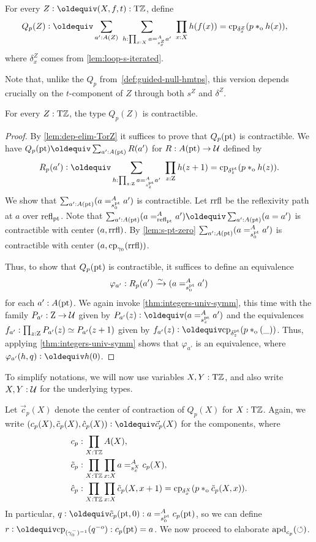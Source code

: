 \documentclass[a4paper,12pt]{amsart}
\begin{document}
\begin{definition}\label{def:guided-null-hmtps-dep}
For every $Z\defeq(X,f,t):\TorZ$, define
\begin{align*}\label{eq:TBD}
Q_p(Z)&\defeq \sum_{a' : A(Z)}~\sum_{h : \prod_{x:X} a =^A_{s^Z_x} a'}~\prod_{x:X} h(f(x)) = \cp{\delta^Z_x}(p\cto h(x)),
\end{align*}
where $\delta^Z_x$ comes from \cref{lem:loop-s-iterated}.
\end{definition}
Note that, unlike the $Q_p$ from~\cref{def:guided-null-hmtps},
this version depends crucially on the $t$-component of $Z$ through
both $s^Z$ and $\delta^Z$.

\begin{lemma}\label{lem:guided-null-hmtps-dep}
  For every $Z:{\mathrm{T}\mathbb{Z}}$, the type $Q_p(Z)$ is contractible.
\end{lemma}
\begin{proof}
  By \cref{lem:dep-elim-TorZ} it suffices to prove that $Q_p({\mathord{\mathrm{pt}}})$ is contractible.
  We have $Q_p(\pt)\jdeq \sum_{a':A(\pt)} R(a')$ for $R : A({\mathord{\mathrm{pt}}}) \to \mathcal{U}$ defined by
  \[
    R_p(a') \defeq \sum_{h : \prod_{z:\zet} a =^A_{s^\pt_z} a'}~
    \prod_{z:\zet} h(z+1) = \cp{\delta^\pt_z}(p \cto h(z)).
  \]
  We show that $\sum_{a':A({\mathord{\mathrm{pt}}})} (a =^A_{s^{\mathord{\mathrm{pt}}}_0} {a'})$ is contractible.
  Let $\mathrm{rrfl}$ be the reflexivity path at $a$ over $\mathop{{\mathrm{refl}}_{{\mathord{\mathrm{pt}}}}}$.
  Note that $\sum_{a':A(\pt)} (a =^A_{\refl{\pt}} a') \jdeq \sum_{a':A(\pt)} (a = a')$
  is contractible with center $(a,\mathrm{rrfl})$. By \cref{lem:s-pt-zero}
  $\sum_{a':A({\mathord{\mathrm{pt}}})} (a =^A_{s^{\mathord{\mathrm{pt}}}_0} {a'})$ is contractible with center
  $(a,\mathrm{cp}_{\gamma_0}(\mathrm{rrfl}))$.

  Thus, to show that $Q_p({\mathord{\mathrm{pt}}})$ is contractible,
  it suffices to define an equivalence
  \[
    \varphi_{a'} : R_p(a') \xrightarrow{\sim}{} (a =^A_{s^{\mathord{\mathrm{pt}}}_0} {a'})
  \]
  for each $a' : A({\mathord{\mathrm{pt}}})$.
  We again invoke \cref{thm:integers-univ-symm},
  this time with the family $P_{a'} : \mathrm{Z} \to \mathcal{U}$ given
  by $P_{a'}(z) \defeq (a =^A_{s^\pt_z} {a'})$
  and the equivalences $f_{a'} : \prod_{z:\mathrm{Z}} P_{a'}(z)\simeq P_{a'}(z+1)$
  given by $f_{a'}(z) \defeq \cp{\delta^\pt_z}(p \cto (\blank))$.
  Thus, applying \cref{thm:integers-univ-symm}
  shows that $\varphi_{a'}$ is an equivalence,
  where $\varphi_{a'}(h,q) \defeq h(0)$.
\end{proof}

To simplify notations, we will now use variables $X,Y:{\mathrm{T}\mathbb{Z}}$,
and also write $X,Y:\mathcal{U}$ for the underlying types.

Let $\vec c_p(X)$ denote the center of contraction of $Q_p(X)$ for $X:{\mathrm{T}\mathbb{Z}}$.
Again, we write $(c_p(X),\tilde{c}_p(X),\hat{c}_p(X))\defeq\vec{c}_p(X)$
for the components, where
\begin{align*}
         c_p &: \prod_{X:{\mathrm{T}\mathbb{Z}}} A(X),\\
  \tilde c_p &: \prod_{X:{\mathrm{T}\mathbb{Z}}}\prod_{x:X} a =^A_{s^X_x} c_p(X), \\
    \hat c_p &: \prod_{X:{\mathrm{T}\mathbb{Z}}}\prod_{x:X} \tilde c_p(X,x+1)
               = \mathrm{cp}_{\delta^X_x}(p *_{\mathrm{o}} \tilde c_p(X,x)).
\end{align*}
In particular, $q\defeq \tilde c_p(\pt,0) : a =^A_{s^\pt_0} c_p(\pt)$,
so we can define $r\defeq \cp{(\gamma_0^-)^{-1}}(q^{-o}) : c_p(\pt) = a$.
We now proceed to elaborate $\mathop{{\mathrm{apd}}_{c_p}}({\circlearrowleft})$.
\end{document}
